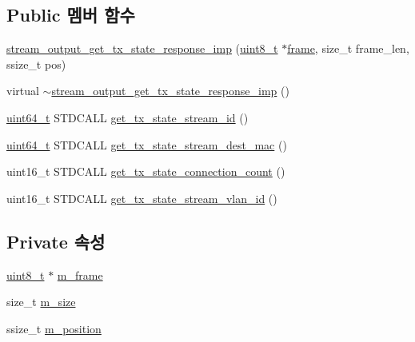 \subsection*{Public 멤버 함수}
\begin{DoxyCompactItemize}
\item 
\hyperlink{classavdecc__lib_1_1stream__output__get__tx__state__response__imp_aa4e88f89ace1eb8d24a4b6b1b86c9804}{stream\+\_\+output\+\_\+get\+\_\+tx\+\_\+state\+\_\+response\+\_\+imp} (\hyperlink{stdint_8h_aba7bc1797add20fe3efdf37ced1182c5}{uint8\+\_\+t} $\ast$\hyperlink{gst__avb__playbin_8c_ac8e710e0b5e994c0545d75d69868c6f0}{frame}, size\+\_\+t frame\+\_\+len, ssize\+\_\+t pos)
\item 
virtual \hyperlink{classavdecc__lib_1_1stream__output__get__tx__state__response__imp_a7f4e518d21ba55dae795c359fac19719}{$\sim$stream\+\_\+output\+\_\+get\+\_\+tx\+\_\+state\+\_\+response\+\_\+imp} ()
\item 
\hyperlink{parse_8c_aec6fcb673ff035718c238c8c9d544c47}{uint64\+\_\+t} S\+T\+D\+C\+A\+LL \hyperlink{classavdecc__lib_1_1stream__output__get__tx__state__response__imp_a56f583db065602dd071cac501aae0c20}{get\+\_\+tx\+\_\+state\+\_\+stream\+\_\+id} ()
\item 
\hyperlink{parse_8c_aec6fcb673ff035718c238c8c9d544c47}{uint64\+\_\+t} S\+T\+D\+C\+A\+LL \hyperlink{classavdecc__lib_1_1stream__output__get__tx__state__response__imp_ad101079eb06cb59228f8256cc99d1841}{get\+\_\+tx\+\_\+state\+\_\+stream\+\_\+dest\+\_\+mac} ()
\item 
uint16\+\_\+t S\+T\+D\+C\+A\+LL \hyperlink{classavdecc__lib_1_1stream__output__get__tx__state__response__imp_a9654ce9f3bf2bafcdacd288a372ac7eb}{get\+\_\+tx\+\_\+state\+\_\+connection\+\_\+count} ()
\item 
uint16\+\_\+t S\+T\+D\+C\+A\+LL \hyperlink{classavdecc__lib_1_1stream__output__get__tx__state__response__imp_abe7fbf4bbe954ffa5e21010c52f16d58}{get\+\_\+tx\+\_\+state\+\_\+stream\+\_\+vlan\+\_\+id} ()
\end{DoxyCompactItemize}
\subsection*{Private 속성}
\begin{DoxyCompactItemize}
\item 
\hyperlink{stdint_8h_aba7bc1797add20fe3efdf37ced1182c5}{uint8\+\_\+t} $\ast$ \hyperlink{classavdecc__lib_1_1stream__output__get__tx__state__response__imp_a50417969cf438e7c8d698726bbbe2ff9}{m\+\_\+frame}
\item 
size\+\_\+t \hyperlink{classavdecc__lib_1_1stream__output__get__tx__state__response__imp_a0dc3c363255f193681c77b4d2a82e995}{m\+\_\+size}
\item 
ssize\+\_\+t \hyperlink{classavdecc__lib_1_1stream__output__get__tx__state__response__imp_af5e691c4a8a0feb07f48440b321206cd}{m\+\_\+position}
\end{DoxyCompactItemize}


